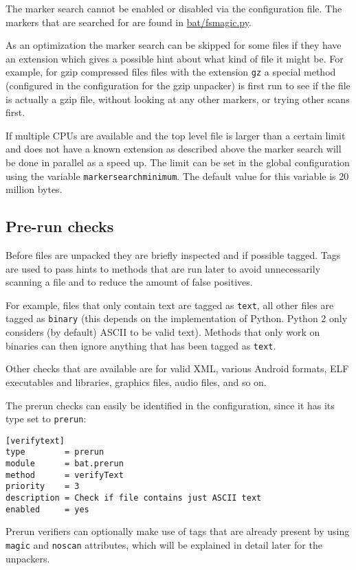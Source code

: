 \documentclass[10pt,a4paper]{article}
\begin{document}
The marker search cannot be enabled or disabled via the configuration file. The
markers that are searched for are found in \url{bat/fsmagic.py}.

As an optimization the marker search can be skipped for some files if they
have an extension which gives a possible hint about what kind of file it might
be. For example, for gzip compressed files files with the extension \texttt{gz}
a special method (configured in the configuration for the gzip unpacker) is
first run to see if the file is actually a gzip file, without looking at any
other markers, or trying other scans first.

If multiple CPUs are available and the top level file is larger than a certain
limit and does not have a known extension as described above the marker search
will be done in parallel as a speed up. The limit can be set in the global
configuration using the variable \texttt{markersearchminimum}. The default
value for this variable is 20 million bytes.

\subsection{Pre-run checks}

Before files are unpacked they are briefly inspected and if possible tagged.
Tags are used to pass hints to methods that are run later to avoid unnecessarily
scanning a file and to reduce the amount of false positives.

For example, files that only contain text are tagged as \texttt{text}, all other
files are tagged as \texttt{binary} (this depends on the implementation of
Python. Python 2 only considers (by default) ASCII to be valid text). Methods
that only work on binaries can then ignore anything that has been tagged as
\texttt{text}.

Other checks that are available are for valid XML, various Android formats,
ELF executables and libraries, graphics files, audio files, and so on.

The prerun checks can easily be identified in the configuration, since it has
its type set to \texttt{prerun}:

\begin{verbatim}
[verifytext]
type        = prerun
module      = bat.prerun
method      = verifyText
priority    = 3
description = Check if file contains just ASCII text
enabled     = yes
\end{verbatim}

Prerun verifiers can optionally make use of tags that are already present by
using \texttt{magic} and \texttt{noscan} attributes, which will be explained
in detail later for the unpackers.
\end{document}
